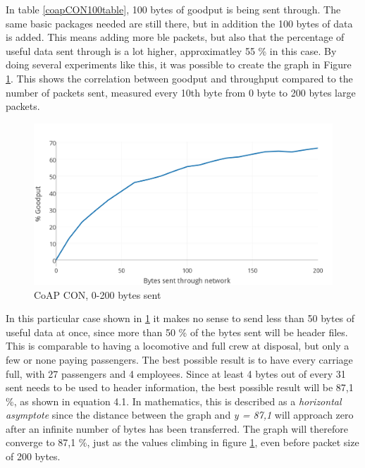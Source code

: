 \noindent In table \ref{coapCON100table}, 100 bytes of goodput is being sent through. The same basic packages needed are still there, but in addition the 100 bytes of data is added. This means adding more \gls{ble} packets, but also that the percentage of useful data sent through is a lot higher, approximatley 55 \% in this case. By doing several experiments like this, it was possible to create the graph in Figure \ref{fig:coapCON0200}. This shows the correlation between goodput and throughput compared to the number of packets sent, measured every 10th byte from 0 byte to 200 bytes large packets.


\begin{figure}[ht]
    \centering
    \includegraphics[scale=1.0]{CoAPCON_0-200_Thicker2.png}    
    \caption{CoAP CON, 0-200 bytes sent}
    \label{fig:coapCON0200}
\end{figure}



\noindent In this particular case shown in \ref{fig:coapCON0200} it makes no sense to send less than 50 bytes of useful data at once, since more than 50 \% of the bytes sent will be header files. This is comparable to having a locomotive and full crew at disposal, but only a few or none paying passengers. The best possible result is to have every carriage full, with 27 passengers and 4 employees. Since at least 4 bytes out of every 31 sent needs to be used to header information, the best possible result will be 87,1 \%, as shown in equation 4.1. In mathematics, this is described as a \textit{horizontal asymptote} since the distance between the graph and \textit{y = 87,1} will approach zero after an infinite number of bytes has been transferred. The graph will therefore converge to 87,1 \%, just as the values climbing in figure \ref{fig:coapCON0200}, even before packet size of 200 bytes.  

